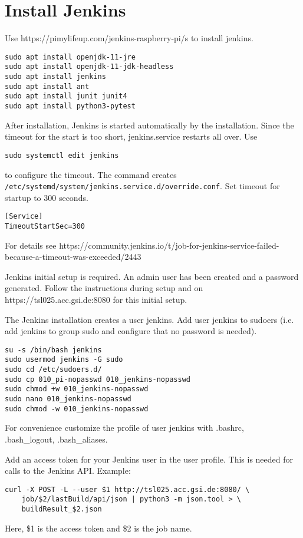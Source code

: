 \documentclass[12pt,a4paper]{report}
\begin{document}
\chapter{Install Jenkins}
Use https://pimylifeup.com/jenkins-raspberry-pi/s to install jenkins.
\begin{verbatim}
sudo apt install openjdk-11-jre
sudo apt install openjdk-11-jdk-headless
sudo apt install jenkins
sudo apt install ant
sudo apt install junit junit4
sudo apt install python3-pytest
\end{verbatim}
After installation, Jenkins is started automatically by the installation.
Since the timeout for the start is too short, jenkins.service restarts all over. Use
\begin{verbatim}
sudo systemctl edit jenkins
\end{verbatim}
to configure the timeout. The command creates \\
\texttt{/etc/systemd/system/jenkins.service.d/override.conf}.
Set timeout for startup to 300 seconds.
\begin{verbatim}
[Service]
TimeoutStartSec=300
\end{verbatim}
For details see https://community.jenkins.io/t/job-for-jenkins-service-failed-because-a-timeout-was-exceeded/2443

Jenkins initial setup is required. An admin user has been created and a password generated.
Follow the instructions during setup and on \\
https://tsl025.acc.gsi.de:8080 for this initial setup.

The Jenkins installation creates a user jenkins. Add user jenkins to sudoers (i.e. add
jenkins to group sudo and configure that no password is needed).
\begin{verbatim}
su -s /bin/bash jenkins
sudo usermod jenkins -G sudo
sudo cd /etc/sudoers.d/
sudo cp 010_pi-nopasswd 010_jenkins-nopasswd
sudo chmod +w 010_jenkins-nopasswd
sudo nano 010_jenkins-nopasswd
sudo chmod -w 010_jenkins-nopasswd
\end{verbatim}

For convenience customize the profile of user jenkins with .bashrc,\\
.bash\_logout, .bash\_aliases.

Add an access token for your Jenkins user in the user profile. This is
needed for calls to the Jenkins API. Example:
\begin{verbatim}
curl -X POST -L --user $1 http://tsl025.acc.gsi.de:8080/ \
    job/$2/lastBuild/api/json | python3 -m json.tool > \
    buildResult_$2.json
\end{verbatim}
Here, \$1 is the access token and \$2 is the job name.
\end{document}
